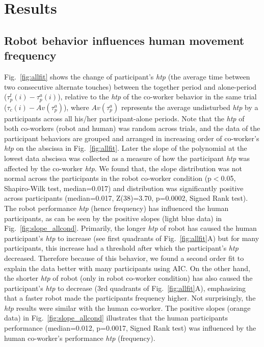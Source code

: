 
\clearpage

\section{Results}

\subsection{Robot behavior influences human movement frequency}

Fig.~\ref{fig:allfit} shows the change of participant's {\it htp} (the average time between two consecutive alternate touches) between the together period and alone-period ($\tau_p^t(i)-\tau_p^a(i)$), relative to the {\it htp} of the co-worker behavior in the same trial ($\tau_c (i)-Av(\tau_p^a)$), where $Av(\tau_p^a)$ represents the average undisturbed {\it htp} by a participants across all his/her participant-alone periods. Note that the {\it htp} of both co-workers (robot and human) was random across trials, and the data of the participant behaviors are grouped and arranged in increasing order of co-worker's {\it htp} on the abscissa in Fig.~\ref{fig:allfit}. Later the slope of the polynomial at the lowest data abscissa was collected as a measure of how the participant {\it htp} was affected by the co-worker {\it htp}.
We found that, the slope distribution was not normal across the participants in the robot co-worker condition (p$<$0.05, Shapiro-Wilk test, median=0.017) and distribution was significantly positive across participants (median=0.017, Z(38)=3.70, p=0.0002, Signed Rank test). The robot performance {\it htp} (hence frequency) has influenced the human participants, as can be seen by the positive slopes (light blue data) in Fig.~\ref{fig:slope_allcond}. Primarily, the longer \textit{htp} of robot has caused the human participant's {\it htp} to increase (see first quadrants of Fig.~\ref{fig:allfit}A) but for many participants, this increase had a threshold after which the participant's {\it htp} decreased. Therefore because of this behavior, we found a second order fit to explain the data better with many participants using AIC. On the other hand, the shorter \textit{htp} of robot (only in robot co-worker condition) has also caused the participant's {\it htp} to decrease (3rd quadrants of Fig.~\ref{fig:allfit}A), emphasizing that a faster robot made the participants frequency higher. Not surprisingly, the {\it htp} results were similar with the human co-worker. The positive slopes (orange data) in Fig.~\ref{fig:slope_allcond} illustrates that the human participants performance (median=0.012, p=0.0017, Signed Rank test) was influenced by the human co-worker's performance {\it htp} (frequency).


